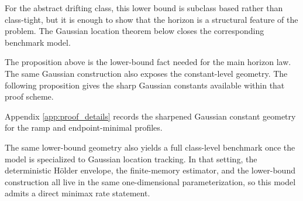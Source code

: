 For the abstract drifting class, this lower bound is subclass based rather than
class-tight, but it is enough to show that the horizon is a structural feature
of the problem. The Gaussian location theorem below closes the corresponding
benchmark model.

The proposition above is the lower-bound fact needed for the main horizon law.
The same Gaussian construction also exposes the constant-level geometry.
The following proposition gives the sharp Gaussian constants available within
that proof scheme.

Appendix \cref{app:proof_details} records the sharpened Gaussian constant
geometry for the ramp and endpoint-minimal profiles.

The same lower-bound geometry also yields a full class-level benchmark once
the model is specialized to Gaussian location tracking. In that setting, the
deterministic H\"older envelope, the finite-memory estimator, and the lower-bound
construction all live in the same one-dimensional parameterization, so this
model admits a direct minimax rate statement.



